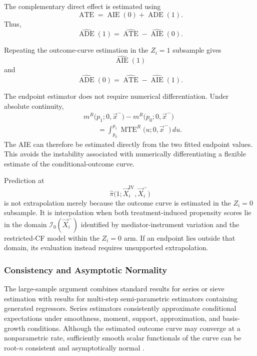 The complementary direct effect is estimated using
\[
    \operatorname{ATE}
    =
    \operatorname{AIE}(0)
    +
    \operatorname{ADE}(1).
\]
Thus,
\[
    \boxed{
    \widehat{\operatorname{ADE}}(1)
    =
    \widehat{\operatorname{ATE}}
    -
    \widehat{\operatorname{AIE}}(0)
    }.
    \label{eqn:ade1-estimator}
\]

Repeating the outcome-curve estimation in the $Z_i=1$ subsample gives
\[
    \widehat{\operatorname{AIE}}(1)
\]
and
\[
    \boxed{
    \widehat{\operatorname{ADE}}(0)
    =
    \widehat{\operatorname{ATE}}
    -
    \widehat{\operatorname{AIE}}(1)
    }.
\]

The endpoint estimator does not require numerical differentiation.
Under absolute continuity,
\[
    \begin{aligned}
    &m^R
    \big(
        p_1;
        0,
        \vec x^-
    \big)
    -
    m^R
    \big(
        p_0;
        0,
        \vec x^-
    \big)
    \\
    &\qquad=
    \int_{p_0}^{p_1}
        \operatorname{MTE}^R
        \big(
            u;
            0,
            \vec x^-
        \big)
    \,du.
    \end{aligned}
\]
The AIE can therefore be estimated directly from the two fitted endpoint values.
This avoids the instability associated with numerically differentiating a flexible estimate of the conditional-outcome curve.

Prediction at
\[
    \widehat\pi
    \big(
        1;
        \vec X_i^{\mathrm{IV}},
        \vec X_i^-
    \big)
\]
is not extrapolation merely because the outcome curve is estimated in the $Z_i=0$ subsample.
It is interpolation when both treatment-induced propensity scores lie in the domain $\mathcal I_0(\vec X_i^-)$ identified by mediator-instrument variation and the restricted-CF model within the $Z_i=0$ arm.
If an endpoint lies outside that domain, its evaluation instead requires unsupported extrapolation.

\subsubsection{Consistency and Asymptotic Normality}

The large-sample argument combines standard results for series or sieve estimation with results for multi-step semi-parametric estimators containing generated regressors.
Series estimators consistently approximate conditional expectations under smoothness, moment, support, approximation, and basis-growth conditions.
Although the estimated outcome curve may converge at a nonparametric rate, sufficiently smooth scalar functionals of the curve can be root-$n$ consistent and asymptotically normal \citep{newey1997convergence,chen2007large}.

